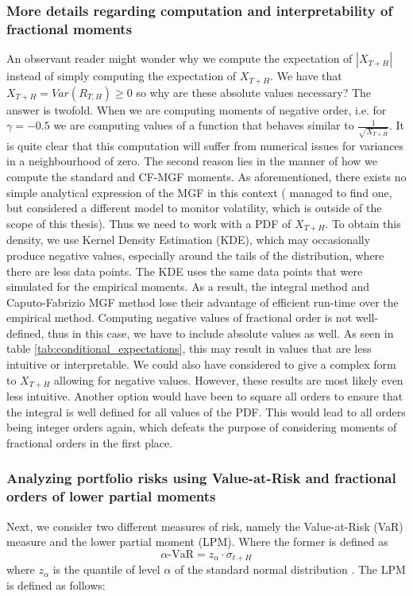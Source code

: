 \subsubsection{More details regarding computation and interpretability of fractional moments}
An observant reader might wonder why we compute the expectation of \(| X_{T + H}|\) instead of simply computing the expectation of \( X_{T + H}\). We have that \(X_{T+H} = Var(R_{T,H}) \geq 0\) so why are these absolute values necessary? The answer is twofold. When we are computing moments of negative order, i.e. for \(\gamma = -0.5\) we are computing values of a function that behaves similar to \(\displaystyle \frac{1}{\sqrt{X_{T+H}}}\). It is quite clear that this computation will suffer from numerical issues for variances in a neighbourhood of zero. The second reason lies in the manner of how we compute the standard and CF-MGF moments. As aforementioned, there exists no simple analytical expression of the MGF in this context ( \citet{hansen2024} managed to find one, but considered a different model to monitor volatility, which is outside of the scope of this thesis). Thus we need to work with a PDF of \(X_{T+H}\). To obtain this density, we use Kernel Density Estimation (KDE), which may occasionally produce negative values, especially around the tails of the distribution, where there are less data points. The KDE uses the same data points that were simulated for the empirical moments. As a result, the integral method and Caputo-Fabrizio MGF method lose their advantage of efficient run-time over the empirical method. Computing negative values of fractional order is not well-defined, thus in this case, we have to include absolute values as well. As seen in table \ref{tab:conditional_expectations}, this may result in values that are less intuitive or interpretable. We could also have considered to give a complex form to \(X_{T+H}\) allowing for negative values. However, these results are most likely even less intuitive. Another option would have been to square all orders to ensure that the integral is well defined for all values of the PDF. This would lead to all orders being integer orders again, which defeats the purpose of considering moments of fractional orders in the first place.

\subsubsection{Analyzing portfolio risks using Value-at-Risk and fractional orders of lower partial moments}
Next, we consider two different measures of risk, namely the Value-at-Risk (VaR) measure and the lower partial moment (LPM). Where the former is defined as 
\begin{equation}
    \alpha\text{-VaR} = z_\alpha \cdot \sigma_{t + H} 
\end{equation}
 where \(z_\alpha\) is the quantile of level \(\alpha\) of the standard normal distribution \citep{holton2013}.
 The LPM is defined as follows:

